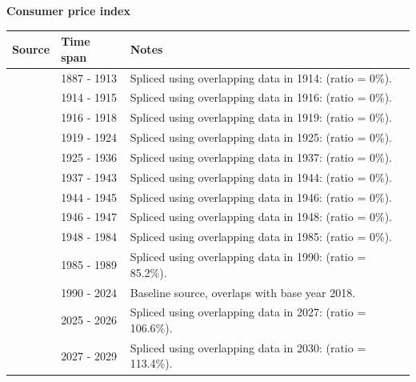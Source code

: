\documentclass[12pt,a4paper,landscape]{article}
\begin{document}
\begin{adjustbox}{max totalsize={\paperwidth}{\paperheight},center}
\begin{minipage}[t][\textheight][t]{\textwidth}
\vspace*{0.5cm}
{}
\begin{center}
{\Large\bfseries Consumer price index}
\end{center}
\vspace{0.5cm}
\begin{table}[H]
\centering
\small
\begin{tabular}{|l|l|l|}
\hline
\textbf{Source} & \textbf{Time span} & \textbf{Notes} \\
\hline
\rowcolor{white}\cite{NBS}& 1887 - 1913 &Spliced using overlapping data in 1914: (ratio = 0\%). \\
\rowcolor{lightgray}\cite{HFS}& 1914 - 1915 &Spliced using overlapping data in 1916: (ratio = 0\%). \\
\rowcolor{white}\cite{NBS}& 1916 - 1918 &Spliced using overlapping data in 1919: (ratio = 0\%). \\
\rowcolor{lightgray}\cite{HFS}& 1919 - 1924 &Spliced using overlapping data in 1925: (ratio = 0\%). \\
\rowcolor{white}\cite{IHD}& 1925 - 1936 &Spliced using overlapping data in 1937: (ratio = 0\%). \\
\rowcolor{lightgray}\cite{HFS}& 1937 - 1943 &Spliced using overlapping data in 1944: (ratio = 0\%). \\
\rowcolor{white}\cite{NBS}& 1944 - 1945 &Spliced using overlapping data in 1946: (ratio = 0\%). \\
\rowcolor{lightgray}\cite{Mitchell}& 1946 - 1947 &Spliced using overlapping data in 1948: (ratio = 0\%). \\
\rowcolor{white}\cite{WB_CC}& 1948 - 1984 &Spliced using overlapping data in 1985: (ratio = 0\%). \\
\rowcolor{lightgray}\cite{WDI}& 1985 - 1989 &Spliced using overlapping data in 1990: (ratio = 85.2\%). \\
\rowcolor{white}\cite{BIS}& 1990 - 2024 &Baseline source, overlaps with base year 2018. \\
\rowcolor{lightgray}\cite{AMECO}& 2025 - 2026 &Spliced using overlapping data in 2027: (ratio = 106.6\%). \\
\rowcolor{white}\cite{IMF_WEO_forecast}& 2027 - 2029 &Spliced using overlapping data in 2030: (ratio = 113.4\%). \\

\end{tabular}
\end{table}
\end{minipage}
\end{adjustbox}
\end{document}
